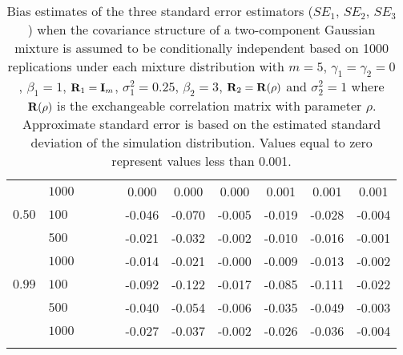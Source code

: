 \begin{landscape}
\begin{table}[ht]
\begin{center}
\begin{tabular}{llccccccccc}
    & $1000$ &   &   &   & 0.000 & 0.000 & 0.000 & 0.001 & 0.001 & 0.001 \\ 
  $0.50$ & $100$ &   &   &   & -0.046 & -0.070 & -0.005 & -0.019 & -0.028 & -0.004 \\ 
    & $500$ &   &   &   & -0.021 & -0.032 & -0.002 & -0.010 & -0.016 & -0.001 \\ 
    & $1000$ &   &   &   & -0.014 & -0.021 & -0.000 & -0.009 & -0.013 & -0.002 \\ 
  $0.99$ & $100$ &   &   &   & -0.092 & -0.122 & -0.017 & -0.085 & -0.111 & -0.022 \\ 
    & $500$ &   &   &   & -0.040 & -0.054 & -0.006 & -0.035 & -0.049 & -0.003 \\ 
    & $1000$ &   &   &   & -0.027 & -0.037 & -0.002 & -0.026 & -0.036 & -0.004 \\ 
   \thickhline\end{tabular}
\caption{Bias estimates of the three standard error estimators ($SE_1$, $SE_2$, $SE_3$) when the covariance structure of a two-component Gaussian mixture is assumed to be conditionally independent based on 1000 replications under each mixture distribution with $m=5$, $\gamma_1=\gamma_2=0$, $\beta_{1}=1$, $\mathbf R_1=\mathbf I_{m}$, $\sigma_1^{2}=0.25$, $\beta_2=3$, $\mathbf R_2=\mathbf R(\rho)$ and $\sigma_2^{2}=1$ where $\mathbf R(\rho)$ is the exchangeable correlation matrix with parameter $\rho$. Approximate standard error is based on the estimated standard deviation of the simulation distribution. Values equal to zero represent values less than 0.001.}
\label{tab:dep2}
\end{center}
\end{table}
\end{landscape}
